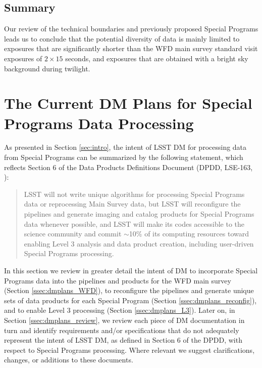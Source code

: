\documentclass[DM,lsstdraft,toc]{lsstdoc}
\begin{document}
\subsection{Summary}\label{ssec:data_summary}

Our review of the technical boundaries and previously proposed Special Programs leads us to conclude that the potential diversity of data is mainly limited to exposures that are significantly shorter than the WFD main survey standard visit exposures of $2\times15$ seconds, and exposures that are obtained with a bright sky background during twilight. 






\section{The Current DM Plans for Special Programs Data Processing} \label{sec:dmplans}

As presented in Section \ref{sec:intro}, the intent of LSST DM for processing data from Special Programs can be summarized by the following statement, which reflects Section 6 of the Data Products Definitions Document (DPDD, LSE-163, \cite{LSE-163}):

\begin{quote}
LSST will not write unique algorithms for processing Special Programs data or reprocessing Main Survey data, but LSST will reconfigure the pipelines and generate imaging and catalog products for Special Programs data whenever possible, and LSST will make its codes accessible to the science community and commit $\sim$10\% of its computing resources toward enabling Level 3 analysis and data product creation, including user-driven Special Programs processing.
\end{quote}

In this section we review in greater detail the intent of DM to incorporate Special Programs data into the pipelines and products for the WFD main survey (Section \ref{ssec:dmplans_WFD}), to reconfigure the pipelines and generate unique sets of data products for each Special Program (Section \ref{ssec:dmplans_reconfig}), and to enable Level 3 processing (Section \ref{ssec:dmplans_L3}). Later on, in Section \ref{ssec:dmplans_review}, we review each piece of DM documentation in turn and identify requirements and/or specifications that do not adequately represent the intent of LSST DM, as defined in Section 6 of the DPDD, with respect to Special Programs processing. Where relevant we suggest clarifications, changes, or additions to these documents.
\end{document}
